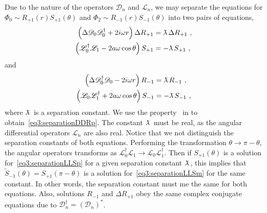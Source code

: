 Due to the nature of the operators $\mathscr{D}_n$ and $\mathscr{L}_n$, we may separate the equations for $\Phi_0 \sim R_{+1}(r) S_{+1}(\theta)$ and $\Phi_2 \sim R_{-1}(r) S_{-1}(\theta)$ into two pairs of equations, 
\begin{subequations}
    \begin{align}
        \label{eq3:separationDDRp}
        \left(\Delta \mathscr{D}_0 \mathscr{D}^\dagger_0 + 2 i \omega r \right) \Delta R_{+1} 
        &= \lambdabar \Delta R_{+1} ~, \\
        \label{eq3:separationLLSp}
        \left( \mathscr{L}^\dagger_0 \mathscr{L}_1 - 2 a \omega \cos\theta \right) S_{+1}
        &= - \lambdabar S_{+1}  ~, 
    \end{align}
    \label{eq3:separationRSp}
\end{subequations}
and
\begin{subequations}
    \begin{align}
        \label{eq3:separationDDRm}
        \left( \Delta \mathscr{D}^\dagger_0 \mathscr{D}_0 - 2 i \omega r \right) R_{-1}
        &= \lambdabar R_{-1} ~, \\
        \label{eq3:separationLLSm}
        \left( \mathscr{L}_0 \mathscr{L}^\dagger_1 + 2 a \omega \cos\theta \right) S_{-1}
        &= - \lambdabar S_{-1}  ~,
    \end{align}
    \label{eq3:separationRSm}
\end{subequations}
where $\lambdabar$ is a separation constant.
We use the property~ in to obtain~\eqref{eq3:separationDDRp}.
The constant $\lambdabar$ must be real, as the angular differential operators $\mathscr{L}_n$ are also real.
Notice that we not distinguish the separation constants of both equations. Performing the transformation $\theta \rightarrow \pi-\theta$, the angular operators transforms as $\mathscr{L}^\dagger_0 \mathscr{L}_1 \rightarrow \mathscr{L}_0 \mathscr{L}^\dagger_1$. Then if $S_{+1}(\theta)$ is a solution for~\eqref{eq3:separationLLSp} for a given separation constant $\lambdabar$, this implies that $\tilde{S}_{-1}(\theta)=S_{+1}(\pi-\theta)$ is a solution for~\eqref{eq3:separationLLSm} for the same constant. 
In other words, the separation constant must me the same for both equations. 
Also, solutions $R_{-1}$ and $\Delta R_{+1}$ obey the same complex conjugate equations due to $\mathscr{D}^\dagger_n=(\mathscr{D}_n)^*$.

